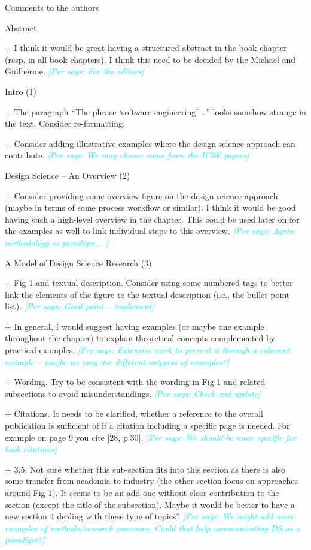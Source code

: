 \documentclass{article}
\newcommand{\per}[1]{\textcolor{cyan}{{\it [Per says: #1]}}}
\newcommand{\per}[1]{}
\begin{document}
Comments to the authors

Abstract

+ I think it would be great having a structured abstract in the book chapter (resp. in all book chapters). I think this need to be decided by the Michael and Guilherme. \per{For the editors}

Intro (1)

+ The paragraph “The phrase ‘software engineering” ..” looks somehow strange in the text. Consider re-formatting.

+ Consider adding illustrative examples where the design science approach can contribute. \per{We may choose some from the ICSE papers}

Design Science – An Overview (2)

+ Consider providing some overview figure on the design science approach (maybe in terms of some process workflow or similar). I think it would be good having such a high-level overview in the chapter. This could be used later on for the examples as well to link individual steps to this overview. \per{Again, methodology vs paradigm... }

A Model of Design Science Research (3)

+ Fig 1 and textual description. Consider using some numbered tags to better link the elements of the figure to the textual description (i.e., the bullet-point list). \per{Good point -- implement}

+ In general, I would suggest having examples (or maybe one example throughout the chapter) to explain theoretical concepts complemented by practical examples. \per{Extensive work to present it through a coherent example -- maybe we may use different snippets of examples?}

+ Wording. Try to be consistent with the wording in Fig 1 and related subsections to avoid misunderstandings. \per{Check and update}

+ Citations. It needs to be clarified, whether a reference to the overall publication is sufficient of if a citation including a specific page is needed. For example on page 9 you cite [28, p.30]. \per{We should be more specific for book citations}

+ 3.5. Not sure whether this sub-section fits into this section as there is also some transfer from academia to industry (the other section focus on approaches around Fig 1). It seems to be an add one without clear contribution to the section (except the title of the subsection). Maybe it would be better to have a new section 4 dealing with these type of topics? \per{We might add more examples of methods/research processes. Could that help communicating DS as a paradigm?}
\end{document}
